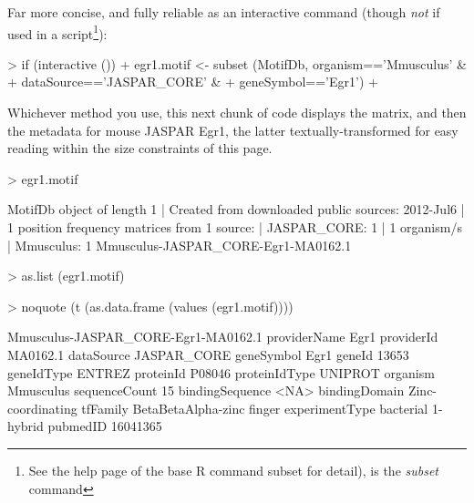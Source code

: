\documentclass{article}
\renewenvironment{Schunk}{\vspace{\topsep}}{\vspace{\topsep}}
\begin{document}
Far more concise, and fully reliable as an interactive command (though \emph{not} if used in a 
script\footnote{See the help page of the base R command subset for detail), is the \emph{subset} command}):
\begin{Schunk}
\begin{Sinput}
> if (interactive ()) {
+   egr1.motif <- subset (MotifDb, organism=='Mmusculus' & 
+                         dataSource=='JASPAR_CORE' & 
+                         geneSymbol=='Egr1')
+   }
\end{Sinput}
\end{Schunk}
Whichever method you use, this next chunk of code displays the matrix, and then the metadata for mouse JASPAR Egr1, the latter
textually-transformed for easy reading within the size constraints of this page.
\begin{Schunk}
\begin{Sinput}
> egr1.motif
\end{Sinput}
\begin{Soutput}
MotifDb object of length 1
| Created from downloaded public sources: 2012-Jul6
| 1 position frequency matrices from 1 source:
|        JASPAR_CORE:    1
| 1 organism/s
|          Mmusculus:    1
Mmusculus-JASPAR_CORE-Egr1-MA0162.1 
\end{Soutput}
\begin{Sinput}
> as.list (egr1.motif)
\end{Sinput}
\begin{Sinput}
> noquote (t (as.data.frame (values (egr1.motif))))
\end{Sinput}
\begin{Soutput}
                Mmusculus-JASPAR_CORE-Egr1-MA0162.1
providerName    Egr1                               
providerId      MA0162.1                           
dataSource      JASPAR_CORE                        
geneSymbol      Egr1                               
geneId          13653                              
geneIdType      ENTREZ                             
proteinId       P08046                             
proteinIdType   UNIPROT                            
organism        Mmusculus                          
sequenceCount   15                                 
bindingSequence <NA>                               
bindingDomain   Zinc-coordinating                  
tfFamily        BetaBetaAlpha-zinc finger          
experimentType  bacterial 1-hybrid                 
pubmedID        16041365                           
\end{Soutput}
\end{Schunk}
\end{document}
